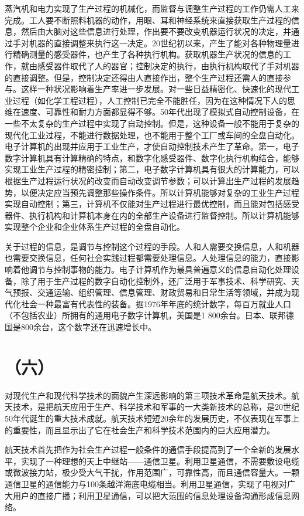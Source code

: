 蒸汽机和电力实现了生产过程的机械化，而监督与调整生产过程的工作仍需人工来完成。工人要不断照料机器的动作，用眼、耳和神经系统来直接获取生产过程的信息，然后由大脑对这些信息进行处理，作出要不要改变机器运行状况的决定，并通过手对机器的直接调整来执行这一决定。20世纪初以来，产生了能对各种物理量进行精确测量的感受器件，也产生了各种执行机构。获取机器生产状况的信息的工作，就由感受器件取代了人的器官；控制决定的执行，由执行机构取代了手对机器的直接调整。但是，控制决定还得由人直接作出，整个生产过程还需人的直接参与。这样一种状况影响着生产率进一步发展。对一些日益精密化、快速化的现代工业过程（如化学工程过程），人工控制已完全不能胜任，因为在这种情况下人的思维在速度、可靠性和耐力方面都显得不够。50年代出现了模拟式自动控制设备，在一些不太复杂的生产过程中实现了自动控制。但是，这种设备一般不能用于复杂的现代化工业过程，不能进行数据处理，也不能用于整个工厂或车间的全盘自动化。电子计算机的出现并应用于工业生产，才使自动控制技术产生了革命。第一，电子数字计算机具有计算精确的特点，和数字化感受器件、数字化执行机构结合，能够实现工业生产过程的精密控制；第二，电子数字计算机具有很大的计算能力，可以根据生产过程运行状况的改变而自动改变调节参数；可以计算出生产过程的发展趋势，以便决定应当预先调整那些操作条件。所以计算机能够对复杂的工业生产过程实现自动控制；第三，计算机不仅能对生产过程进行最优控制，而且能对包括感受器件、执行机构和计算机本身在内的全部生产设备进行监督控制。所以计算机能够实现整个企业和企业体系生产过程的全盘自动化。

关于过程的信息，是调节与控制这个过程的手段。人和人需要交换信息，人和机器也需要交换信息，任何社会实践过程都需要处理信息。人处理信息的能力，直接影响着他调节与控制事物的能力。电子计算机作为最具普遍意义的信息自动化处理设备，除了用于生产过程的数字自动化控制外，还广泛用于军事技术、科学研究、天气预报、交通运输、组织管理、信息管理、财政贸易和日常生活等领域，并成为现代化社会一种最富有代表性的装备。据1976年年底的统计数字，每百万就业人口（不包括农业）所拥有的通用电子数字计算机，美国是1 800余台。日本、联邦德国是800余台，这个数字还在迅速增长中。

\section*{（六）}
对现代生产和现代科学技术的面貌产生深远影响的第三项技术革命是航天技术。航天技术，是把航天应用于生产、科学技术和军事的一大类新技术的总称，是20世纪50年代诞生的重大技术成就。航天技术短短20余年的发展历史，不仅表现在军事上的重要性，而且显示出了它在社会生产和科学技术范围内的巨大应用潜力。

航天技术首先把作为社会生产过程一般条件的通信手段提高到了一个全新的发展水平，实现了一种理想的天上中继站——通信卫星。利用卫星通信，不需要敷设电缆或微波接力站，极少受大气干扰，作用范围广，可靠性高，而且通信容量大。一颗通信卫星的通信能力与100条越洋海底电缆相当。利用卫星通信，实现了电视对广大用户的直接广播；利用卫星通信，可以把大范围的信息处理设备沟通形成信息网络。

